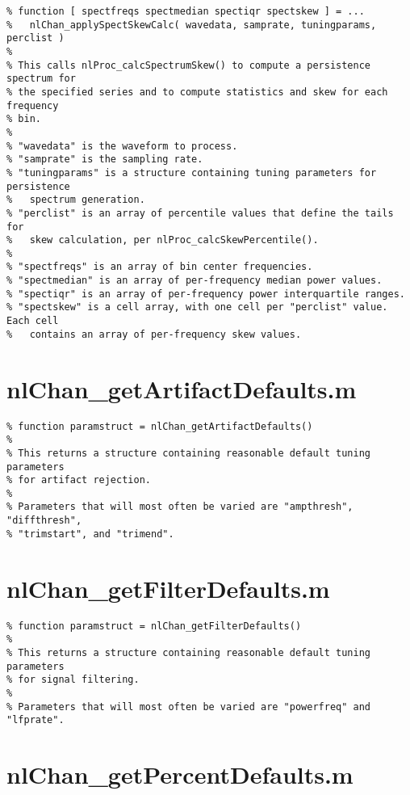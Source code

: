\begin{verbatim}
% function [ spectfreqs spectmedian spectiqr spectskew ] = ...
%   nlChan_applySpectSkewCalc( wavedata, samprate, tuningparams, perclist )
%
% This calls nlProc_calcSpectrumSkew() to compute a persistence spectrum for
% the specified series and to compute statistics and skew for each frequency
% bin.
%
% "wavedata" is the waveform to process.
% "samprate" is the sampling rate.
% "tuningparams" is a structure containing tuning parameters for persistence
%   spectrum generation.
% "perclist" is an array of percentile values that define the tails for
%   skew calculation, per nlProc_calcSkewPercentile().
%
% "spectfreqs" is an array of bin center frequencies.
% "spectmedian" is an array of per-frequency median power values.
% "spectiqr" is an array of per-frequency power interquartile ranges.
% "spectskew" is a cell array, with one cell per "perclist" value. Each cell
%   contains an array of per-frequency skew values.
\end{verbatim}

\section{nlChan\_getArtifactDefaults.m}

\begin{verbatim}
% function paramstruct = nlChan_getArtifactDefaults()
%
% This returns a structure containing reasonable default tuning parameters
% for artifact rejection.
%
% Parameters that will most often be varied are "ampthresh", "diffthresh",
% "trimstart", and "trimend".
\end{verbatim}

\section{nlChan\_getFilterDefaults.m}

\begin{verbatim}
% function paramstruct = nlChan_getFilterDefaults()
%
% This returns a structure containing reasonable default tuning parameters
% for signal filtering.
%
% Parameters that will most often be varied are "powerfreq" and "lfprate".
\end{verbatim}

\section{nlChan\_getPercentDefaults.m}

